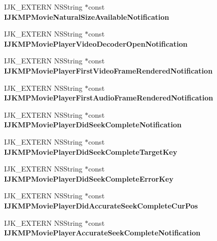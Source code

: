 \begin{DoxyCompactItemize}
\item 
\mbox{\label{protocol_i_j_k_media_playback_01-p_a9a971c9d3a8043fea32f51a30e9d5435}} 
I\+J\+K\+\_\+\+E\+X\+T\+E\+RN N\+S\+String $\ast$const {\bfseries I\+J\+K\+M\+P\+Movie\+Natural\+Size\+Available\+Notification}
\item 
\mbox{\label{protocol_i_j_k_media_playback_01-p_aff4a50df43c4b692e1275cdee3fb3f2c}} 
I\+J\+K\+\_\+\+E\+X\+T\+E\+RN N\+S\+String $\ast$const {\bfseries I\+J\+K\+M\+P\+Movie\+Player\+Video\+Decoder\+Open\+Notification}
\item 
\mbox{\label{protocol_i_j_k_media_playback_01-p_a885ddeb23420bfe3c6b9007b6770943d}} 
I\+J\+K\+\_\+\+E\+X\+T\+E\+RN N\+S\+String $\ast$const {\bfseries I\+J\+K\+M\+P\+Movie\+Player\+First\+Video\+Frame\+Rendered\+Notification}
\item 
\mbox{\label{protocol_i_j_k_media_playback_01-p_aaf1f139d7a9a94105a54e2d962686aae}} 
I\+J\+K\+\_\+\+E\+X\+T\+E\+RN N\+S\+String $\ast$const {\bfseries I\+J\+K\+M\+P\+Movie\+Player\+First\+Audio\+Frame\+Rendered\+Notification}
\item 
\mbox{\label{protocol_i_j_k_media_playback_01-p_ad84d181aa6a5233aa74b84a825484ddf}} 
I\+J\+K\+\_\+\+E\+X\+T\+E\+RN N\+S\+String $\ast$const {\bfseries I\+J\+K\+M\+P\+Movie\+Player\+Did\+Seek\+Complete\+Notification}
\item 
\mbox{\label{protocol_i_j_k_media_playback_01-p_a7d3cd42c54b2f723e3e4ec6e47dd4e5f}} 
I\+J\+K\+\_\+\+E\+X\+T\+E\+RN N\+S\+String $\ast$const {\bfseries I\+J\+K\+M\+P\+Movie\+Player\+Did\+Seek\+Complete\+Target\+Key}
\item 
\mbox{\label{protocol_i_j_k_media_playback_01-p_a26a594b91470868fa9fa797458df35bd}} 
I\+J\+K\+\_\+\+E\+X\+T\+E\+RN N\+S\+String $\ast$const {\bfseries I\+J\+K\+M\+P\+Movie\+Player\+Did\+Seek\+Complete\+Error\+Key}
\item 
\mbox{\label{protocol_i_j_k_media_playback_01-p_ae048a741e323554a74360aac444a962e}} 
I\+J\+K\+\_\+\+E\+X\+T\+E\+RN N\+S\+String $\ast$const {\bfseries I\+J\+K\+M\+P\+Movie\+Player\+Did\+Accurate\+Seek\+Complete\+Cur\+Pos}
\item 
\mbox{\label{protocol_i_j_k_media_playback_01-p_a7b5ce43c9585d95aa01b15d8926d3108}} 
I\+J\+K\+\_\+\+E\+X\+T\+E\+RN N\+S\+String $\ast$const {\bfseries I\+J\+K\+M\+P\+Movie\+Player\+Accurate\+Seek\+Complete\+Notification}
\end{DoxyCompactItemize}
